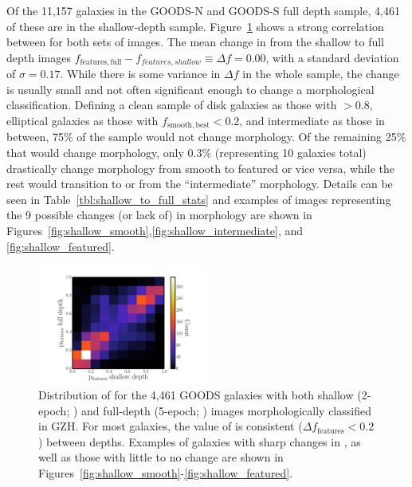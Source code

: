 \documentclass[twocolumn]{aastex6}
\begin{document}
Of the 11,157 galaxies in the GOODS-N and GOODS-S full depth sample, 4,461 of
these are in the shallow-depth sample. Figure~\ref{fig:shallow_vs_full} shows a
strong correlation between \ffeatures{} for both sets of images. The mean
change in \ffeatures{} from the shallow to full depth images
$f_\mathrm{features,full} - f_{features,shallow} \equiv \Delta f = 0.00$, with
a standard deviation of $\sigma = 0.17$. While there is some variance in
$\Delta f$ in the whole sample, the change is usually small and not often
significant enough to change a morphological classification. Defining a clean
sample of disk galaxies as those with \fbest$>0.8$, elliptical galaxies as
those with $f_\mathrm{smooth,best}<0.2$, and intermediate as those in between,
75\% of the sample would not change morphology. Of the remaining 25\% that
would change morphology, only 0.3\% (representing 10 galaxies total)
drastically change morphology from smooth to featured or vice versa, while the
rest would transition to or from the ``intermediate'' morphology. Details can
be seen in Table~\ref{tbl:shallow_to_full_stats} and examples of images
representing the 9 possible changes (or lack of) in morphology are shown in
Figures~\ref{fig:shallow_smooth},\ref{fig:shallow_intermediate}, and
\ref{fig:shallow_featured}.

\begin{figure}
\begin{center}
\includegraphics[width=0.50\textwidth]{figures/full_shallow_p_plot.pdf}
\caption{Distribution of \ffeatures{} for the 4,461 GOODS galaxies with both
shallow (2-epoch; \goods) and full-depth (5-epoch; \main) images
morphologically classified in GZH. For most galaxies, the value of \ffeatures{}
is consistent ($\Delta f_\mathrm{features}<0.2$) between depths. Examples of
galaxies with sharp changes in \ffeatures, as well as those with little to no
change are shown in
Figures~\ref{fig:shallow_smooth}-\ref{fig:shallow_featured}.}
\label{fig:shallow_vs_full}
\end{center}
\end{figure}
\end{document}
